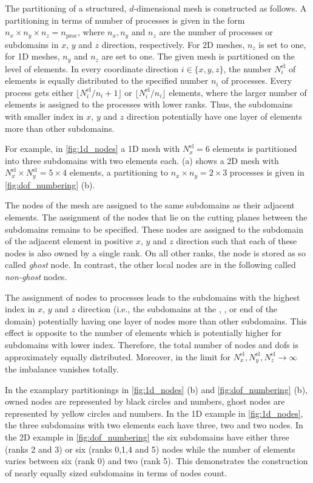 The partitioning of a structured, $d$-dimensional mesh is constructed as follows. A partitioning in terms of number of processes is given in the form $n_x \times n_y \times n_z = n_\text{proc}$, where $n_x,n_y$ and $n_z$ are the number of processes or subdomains in $x$, $y$ and $z$ direction, respectively. For 2D meshes, $n_z$ is set to one, for 1D meshes, $n_y$ and $n_z$ are set to one. The given mesh is partitioned on the level of elements. In every coordinate direction $i \in \{x,y,z\}$, the number $N^\text{el}_i$ of elements is equally distributed to the specified number $n_i$ of processes. Every process gets either $\lfloor N^\text{el}_i/n_i+1\rfloor$ or $\lfloor N^\text{el}_i/n_i \rfloor$ elements, where the larger number of elements is assigned to the processes with lower ranks. Thus, the subdomains with smaller index in $x$, $y$ and $z$ direction potentially have one layer of elements more than other subdomains.

For example, in \cref{fig:1d_nodes} a 1D mesh with $N^\text{el}_x=6$ elements is partitioned into three subdomains with two elements each. 
 (a) shows a 2D mesh with $N^\text{el}_x \times N^\text{el}_y = 5 \times 4$ elements, a partitioning to $n_x \times n_y = 2 \times 3$ processes is given in \cref{fig:dof_numbering} (b).

The nodes of the mesh are assigned to the same subdomains as their adjacent elements. 
The assignment of the nodes that lie on the cutting planes between the subdomains remains to be specified. These nodes are assigned to the subdomain of the adjacent element in positive $x$, $y$ and $z$ direction such that each of these nodes is also owned by a single rank. On all other ranks, the node is stored as so called \emph{ghost} node. In contrast, the other local nodes are in the following called \emph{non-ghost} nodes.

The assignment of nodes to processes leads to the subdomains with the highest index in $x$, $y$ and $z$ direction (i.e., the subdomains at the , , or  end of the domain) potentially having one layer of nodes more than other subdomains. This effect is opposite to the number of elements which is potentially higher for subdomains with lower index. Therefore, the total number of nodes and dofs is  approximately equally distributed. Moreover, in the limit for $N^\text{el}_x,N^\text{el}_y,N^\text{el}_z \to \infty$ the imbalance vanishes totally. 

In the examplary partitionings in \cref{fig:1d_nodes} (b) and \cref{fig:dof_numbering} (b), owned nodes are represented by black circles and numbers, ghost nodes are represented by yellow circles and numbers. In the 1D example in \cref{fig:1d_nodes}, the three subdomains with two elements each have three, two and two nodes. In the 2D example in \cref{fig:dof_numbering} the six subdomains have either three (ranks 2 and 3) or six (ranks 0,1,4 and 5) nodes while the number of elements varies between six (rank 0) and two (rank 5). This demonstrates the construction of nearly equally sized subdomains in terms of nodes count.

